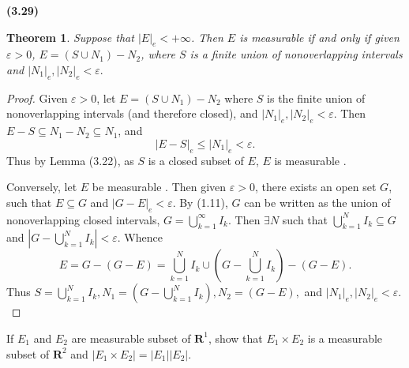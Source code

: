 \documentclass[12pt]{book}
\newcommand{\mable}{measurable }
\renewcommand{\u}{\cup}
\newcommand{\bu}{\bigcup}
\renewcommand{\ss}{\subseteq}
\newcommand{\cross}{\times}
\newcommand{\R}{\mathbf{R}}
\renewcommand{\.}{\mkern1mu}
\newcommand{\e}{\varepsilon}
\newcommand{\abs}[1]{\left| #1 \right|}
\newcommand{\lr}[1]{\left(#1\right)}
\newenvironment{pf}{\begin{proof}\setlength{\parindent}{\normalparindent}\setlength{\parskip}{\normalparskip}}{\end{proof}}
\theoremstyle{theorem}
\newtheorem{theorem}{Theorem}
\newcommand{\thmindent}{\setlength{\parindent}{17pt}}
\newenvironment{thm}[1]
	{\noindent \textbf{#1}\hspace{2ex}\begin{minipage}[t]{\linewidth - \widthof{\textbf{(#1)}}}  \begin{theorem}\thmindent }
	{\end{theorem}\end{minipage}\medskip}
\newcommand{\mes}[1]{\abs{#1}}
\newcommand{\omes}[1]{\mes{#1}_e}
\newlength{\normalparindent}
\newlength{\normalparskip}
\begin{document}
	\begin{thm}{(3.29)}
	 Suppose that $\abs{E}_e < +\infty$. Then $E$ is measurable if and only if given $\e>0$, $E = (S\u N_1) - N_2$, where $S$ is a finite union of nonoverlapping intervals  and $\abs{N_1}_e, \abs{N_2}_e < \e.$
	 \end{thm}
	\begin{pf}
	Given $\e > 0$, let $E = (S\u N_1) - N_2$ where $S$ is the finite union of nonoverlapping intervals (and therefore closed), and $\omes{N_1},\omes{N_2} < \e$. Then $E-S \ss N_1 - N_2 \ss N_1$, and
		\[ \omes{E-S} \leq \omes{N_1} < \e.\]
	Thus by Lemma (3.22), as $S$ is a closed subset of $E$, $E$ is \mable.
	
	Conversely, let $E$ be \mable. Then given $\e>0$, there exists an open set $G$, such that $E\ss G$ and $\omes{G-E} < \e$. By (1.11), $G$ can be written as the union of nonoverlapping closed intervals, $G = \bu_{k=1}^\infty I_k$. Then $\exists N$ such that $\bu_{k=1}^N I_k \ss G$ and $\mes{G - \bu_{k=1}^N I_k} < \e.$ Whence
		\[ E = G - (G-E) = \bu_{k=1}^N I_k \u \lr{G-\bu_{k=1}^N I_k} - (G-E).\]
	Thus $S = \bu_{k=1}^N I_k, N_1 = \lr{G- \bu_{k=1}^N I_k}, N_2 = (G-E),$ and $\omes{N_1},\omes{N_2} <\e.$
	\end{pf}
\item If $E_1$ and $E_2$ are measurable subset of $\R^1$, show that $E_1 \cross E_2$ is a \mable subset of $\R^2$ and $\mes{E_1 \cross E_2} = \mes{E_1}\mes{E_2}.$ 
\end{document}
